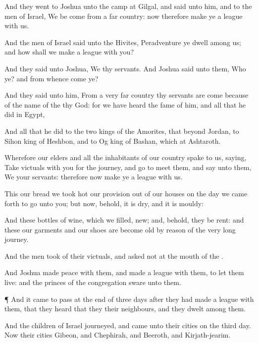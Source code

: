 {And they
went to
Joshua unto the
camp at
Gilgal, and
said unto him, and to the
men of
Israel, We be
come from a
far
country: now therefore
make ye a
league with us.

And the
men of
Israel
said unto the
Hivites,
Peradventure ye
dwell
among us; and how shall we
make a
league with you?

And they
said unto
Joshua, We
{} thy
servants. And
Joshua
said unto them, Who
{} ye? and from
whence
come ye?

And they
said unto him, From a
very
far
country thy
servants are
come because of the
name of the
{} thy
God: for we have
heard the
fame of him, and all that he
did in
Egypt,

And all that he
did to the
two
kings of the
Amorites, that
{}
beyond
Jordan, to
Sihon
king of
Heshbon, and to
Og
king of
Bashan, which
{} at
Ashtaroth.

Wherefore our
elders and all the
inhabitants of our
country
spake to us,
saying,
Take
victuals with
you for the
journey, and
go to
meet them, and
say unto them, We
{} your
servants: therefore now
make ye a
league with us.

This our
bread we took
hot
{} our
provision out of our
houses on the
day we came
forth to
go unto you; but now, behold, it is
dry, and it is
mouldy:

And these
bottles of
wine, which we
filled,
{}
new; and, behold, they be
rent: and these our
garments and our
shoes are become
old by reason of the
very
long
journey.

And the
men
took of their
victuals, and
asked not
{} at the
mouth of the
{}.


\par }{\PP {}And
Joshua
made
peace with them, and
made a
league with them, to let them
live: and the
princes of the
congregation
sware unto them.


\par }{\PP {}¶ And it came to pass at the
end of
three
days
after they had
made a
league with them, that they
heard that they
{} their
neighbours, and
{} they
dwelt
among them.

And the
children of
Israel
journeyed, and
came unto their
cities on the
third
day. Now their
cities
{}
Gibeon, and
Chephirah, and
Beeroth, and
Kirjath-jearim.

}

